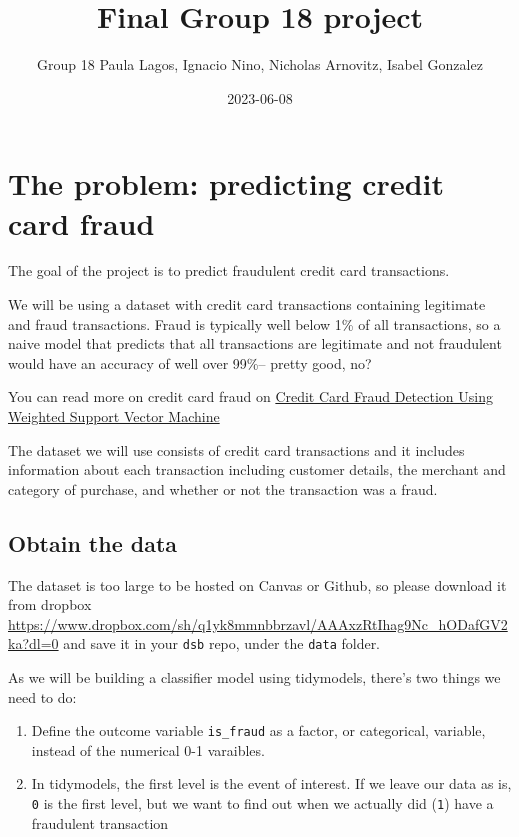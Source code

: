 \documentclass[
]{article}
\title{Final Group 18 project}
\author{Group 18 Paula Lagos, Ignacio Nino, Nicholas Arnovitz, Isabel
Gonzalez}
\date{2023-06-08}
\providecommand{\tightlist}{%
  \setlength{\itemsep}{0pt}\setlength{\parskip}{0pt}}
\begin{document}
\maketitle

{
\setcounter{tocdepth}{2}
\tableofcontents
}
\hypertarget{the-problem-predicting-credit-card-fraud}{%
\section{The problem: predicting credit card
fraud}\label{the-problem-predicting-credit-card-fraud}}

The goal of the project is to predict fraudulent credit card
transactions.

We will be using a dataset with credit card transactions containing
legitimate and fraud transactions. Fraud is typically well below 1\% of
all transactions, so a naive model that predicts that all transactions
are legitimate and not fraudulent would have an accuracy of well over
99\%-- pretty good, no?

You can read more on credit card fraud on
\href{https://www.scirp.org/journal/paperinformation.aspx?paperid=105944}{Credit
Card Fraud Detection Using Weighted Support Vector Machine}

The dataset we will use consists of credit card transactions and it
includes information about each transaction including customer details,
the merchant and category of purchase, and whether or not the
transaction was a fraud.

\hypertarget{obtain-the-data}{%
\subsection{Obtain the data}\label{obtain-the-data}}

The dataset is too large to be hosted on Canvas or Github, so please
download it from dropbox
\url{https://www.dropbox.com/sh/q1yk8mmnbbrzavl/AAAxzRtIhag9Nc_hODafGV2ka?dl=0}
and save it in your \texttt{dsb} repo, under the \texttt{data} folder.

As we will be building a classifier model using tidymodels, there's two
things we need to do:

\begin{enumerate}
\def\labelenumi{\arabic{enumi}.}
\tightlist
\item
  Define the outcome variable \texttt{is\_fraud} as a factor, or
  categorical, variable, instead of the numerical 0-1 varaibles.
\item
  In tidymodels, the first level is the event of interest. If we leave
  our data as is, \texttt{0} is the first level, but we want to find out
  when we actually did (\texttt{1}) have a fraudulent transaction
\end{enumerate}
\end{document}
